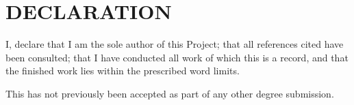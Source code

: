 \chapter*{DECLARATION}

I, \studentfname{} \studentlname{} declare that I am the sole author of this Project; that all references cited have been consulted; that I have conducted all work of which this is a record, and that the finished work lies within the prescribed word limits.

This has not previously been accepted as part of any other degree submission.
\vfill
\noindent \namesigdate{\studentfname{} \studentlname{}} \hfill
 
